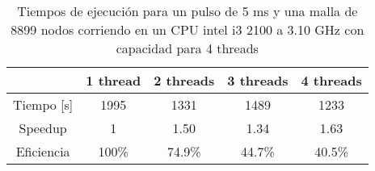 \begin{table}
    \centering
	\begin{tabular}{ c | c c c c }              
		& 1 thread & 2 threads & 3 threads & 4 threads \\
		\hline
		Tiempo [\si{\second}] & 1995 & 1331 & 1489 & 1233 \\
		Speedup & 1 & 1.50 & 1.34 & 1.63 \\
		Eficiencia & 100\% & 74.9\% & 44.7\% & 40.5\% \\
	\end{tabular}
    \caption{Tiempos de ejecución para un pulso de 5 \si{\milli\second} y una malla de 8899 nodos corriendo en un CPU intel i3 2100 a 3.10 GHz con capacidad para 4 threads}
    \label{tab:escala}
\end{table}
